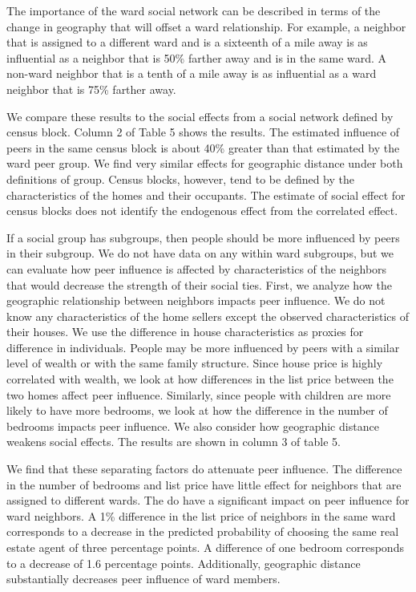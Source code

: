 \documentclass[12pt]{article}
\begin{document}
    The importance of the ward social network can be described in terms of the change in geography that will offset a ward relationship. For example,
    a neighbor that is assigned to a different ward and is a sixteenth of a mile away is as influential as a neighbor that is 50\% farther away and is in the
    same ward. A non-ward neighbor that is a tenth of a mile away is as influential as a ward neighbor that is 75\% farther away.

    We compare these results to the social effects from a social network defined by census block. Column 2 of Table 5 shows the results. The estimated
    influence of peers in the same census block is about 40\% greater than that estimated by the ward peer group. We find very similar effects for
    geographic distance under both definitions of group. Census blocks, however, tend to be defined by the characteristics of the homes and their
    occupants. The estimate of social effect for census blocks does not identify the endogenous effect from the correlated effect.

    If a social group has subgroups, then people should be more influenced by peers in their subgroup. We do not have data on any within ward
    subgroups, but we can evaluate how peer influence is affected by characteristics of the neighbors that would decrease the strength of their social
    ties. First, we analyze how the geographic relationship between neighbors impacts peer influence. We do not know any characteristics of the home
    sellers except the observed characteristics of their houses. We use the difference in house characteristics as proxies for difference in
    individuals. People may be more influenced by peers with a similar level of wealth or with the same family structure. Since house price is highly
    correlated with wealth, we look at how differences in the list price between the two homes affect peer influence. Similarly, since people with
    children are more likely to have more bedrooms, we look at how the difference in the number of bedrooms impacts peer influence. We also consider
    how geographic distance weakens social effects. The results are shown in
    column 3 of table 5.

    We find that these separating factors do attenuate peer influence. The difference in the number of bedrooms and list price have little effect for
    neighbors that are assigned to different wards. The do have a significant impact on peer influence for ward neighbors. A 1\% difference in the
    list price of neighbors in the same ward corresponds to a decrease in the predicted probability of choosing the same real estate agent of three
    percentage points. A difference of one bedroom corresponds to a decrease of 1.6 percentage points. Additionally, geographic distance substantially
    decreases peer influence of ward members.
\end{document}
